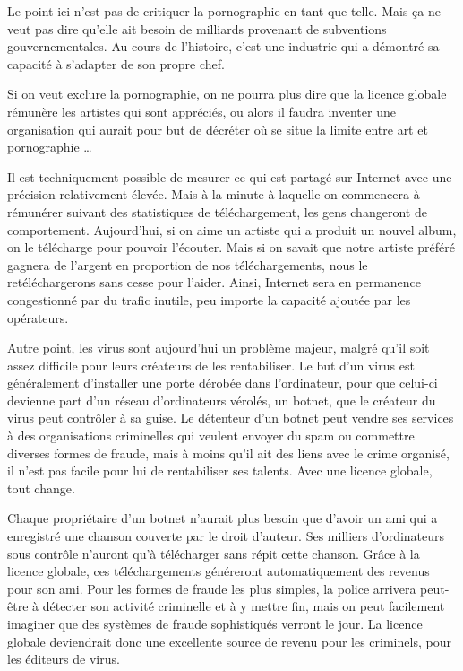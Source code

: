 Le point ici n'est pas de critiquer la pornographie en tant que telle.
Mais ça ne veut pas dire qu'elle ait besoin de milliards provenant de subventions gouvernementales.
Au cours de l'histoire, c'est une industrie qui a démontré sa capacité à s'adapter de son propre chef.

Si on veut exclure la pornographie, on ne pourra plus dire que la licence globale rémunère les artistes qui sont appréciés, ou alors il faudra inventer une organisation qui aurait pour but de décréter où se situe la limite entre art et pornographie \dots{}

Il est techniquement possible de mesurer ce qui est partagé sur Internet avec une précision relativement élevée.
Mais à la minute à laquelle on commencera à rémunérer suivant des statistiques de téléchargement, les gens changeront de comportement.
Aujourd'hui, si on aime un artiste qui a produit un nouvel album, on le télécharge pour pouvoir l'écouter.
Mais si on savait que notre artiste préféré gagnera de l'argent en proportion de nos téléchargements, nous le retéléchargerons sans cesse pour l'aider.
Ainsi, Internet sera en permanence congestionné par du trafic inutile, peu importe la capacité ajoutée par les opérateurs.

Autre point, les virus sont aujourd'hui un problème majeur, malgré qu'il soit assez difficile pour leurs créateurs de les rentabiliser.
Le but d'un virus est généralement d'installer une porte dérobée dans l'ordinateur, pour que celui-ci devienne part d'un réseau d'ordinateurs vérolés, un botnet, que le créateur du virus peut contrôler à sa guise.
Le détenteur d'un botnet peut vendre ses services à des organisations criminelles qui veulent envoyer du spam ou commettre diverses formes de fraude, mais à moins qu'il ait des liens avec le crime organisé, il n'est pas facile pour lui de rentabiliser ses talents.
Avec une licence globale, tout change.

Chaque propriétaire d'un botnet n'aurait plus besoin que d'avoir un ami qui a enregistré une chanson couverte par le droit d'auteur.
Ses milliers d'ordinateurs sous contrôle n'auront qu'à télécharger sans répit cette chanson.
Grâce à la licence globale, ces téléchargements généreront automatiquement des revenus pour son ami.
Pour les formes de fraude les plus simples, la police arrivera peut-être à détecter son activité criminelle et à y mettre fin, mais on peut facilement imaginer que des systèmes de fraude sophistiqués verront le jour.
La licence globale deviendrait donc une excellente source de revenu pour les criminels, pour les éditeurs de virus.

